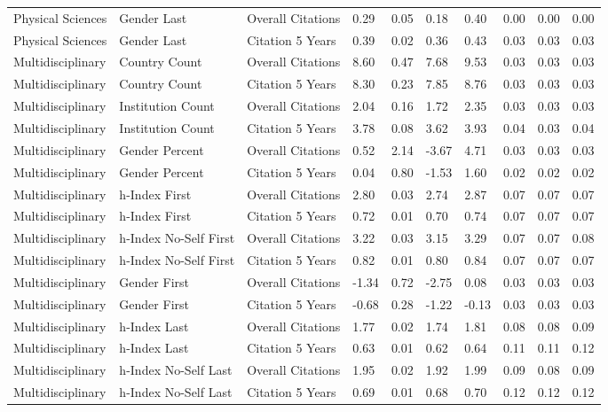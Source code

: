 \documentclass[
  man,floatsintext]{apa6}
\begin{document}
\begin{table}[tbp]
\begin{center}
\begin{threeparttable}
{\begin{tabular}{llllllllll}
Physical Sciences & Gender Last & Overall Citations & 0.29 & 0.05 & 0.18 & 0.40 & 0.00 & 0.00 & 0.00\\
Physical Sciences & Gender Last & Citation 5 Years & 0.39 & 0.02 & 0.36 & 0.43 & 0.03 & 0.03 & 0.03\\
Multidisciplinary & Country Count & Overall Citations & 8.60 & 0.47 & 7.68 & 9.53 & 0.03 & 0.03 & 0.03\\
Multidisciplinary & Country Count & Citation 5 Years & 8.30 & 0.23 & 7.85 & 8.76 & 0.03 & 0.03 & 0.03\\
Multidisciplinary & Institution Count & Overall Citations & 2.04 & 0.16 & 1.72 & 2.35 & 0.03 & 0.03 & 0.03\\
Multidisciplinary & Institution Count & Citation 5 Years & 3.78 & 0.08 & 3.62 & 3.93 & 0.04 & 0.03 & 0.04\\
Multidisciplinary & Gender Percent & Overall Citations & 0.52 & 2.14 & -3.67 & 4.71 & 0.03 & 0.03 & 0.03\\
Multidisciplinary & Gender Percent & Citation 5 Years & 0.04 & 0.80 & -1.53 & 1.60 & 0.02 & 0.02 & 0.02\\
Multidisciplinary & h-Index First & Overall Citations & 2.80 & 0.03 & 2.74 & 2.87 & 0.07 & 0.07 & 0.07\\
Multidisciplinary & h-Index First & Citation 5 Years & 0.72 & 0.01 & 0.70 & 0.74 & 0.07 & 0.07 & 0.07\\
Multidisciplinary & h-Index No-Self First & Overall Citations & 3.22 & 0.03 & 3.15 & 3.29 & 0.07 & 0.07 & 0.08\\
Multidisciplinary & h-Index No-Self First & Citation 5 Years & 0.82 & 0.01 & 0.80 & 0.84 & 0.07 & 0.07 & 0.07\\
Multidisciplinary & Gender First & Overall Citations & -1.34 & 0.72 & -2.75 & 0.08 & 0.03 & 0.03 & 0.03\\
Multidisciplinary & Gender First & Citation 5 Years & -0.68 & 0.28 & -1.22 & -0.13 & 0.03 & 0.03 & 0.03\\
Multidisciplinary & h-Index Last & Overall Citations & 1.77 & 0.02 & 1.74 & 1.81 & 0.08 & 0.08 & 0.09\\
Multidisciplinary & h-Index Last & Citation 5 Years & 0.63 & 0.01 & 0.62 & 0.64 & 0.11 & 0.11 & 0.12\\
Multidisciplinary & h-Index No-Self Last & Overall Citations & 1.95 & 0.02 & 1.92 & 1.99 & 0.09 & 0.08 & 0.09\\
Multidisciplinary & h-Index No-Self Last & Citation 5 Years & 0.69 & 0.01 & 0.68 & 0.70 & 0.12 & 0.12 & 0.12\\

\end{tabular}}
\end{threeparttable}
\end{center}
\end{table}
\end{document}
